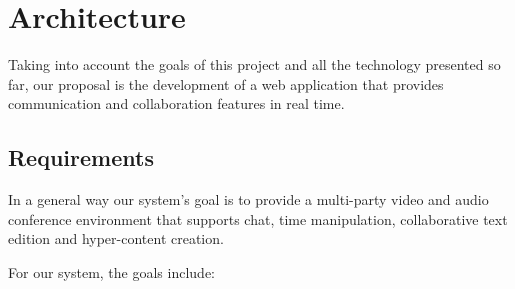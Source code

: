 \chapter{Architecture}
\label{chapter:architecture}


Taking into account the goals of this project and all the technology presented so far, our proposal is the development of a web application that provides communication and collaboration features in real time.

\section{Requirements}
In a general way our system's goal is to provide a multi-party video and audio conference environment that supports chat, time manipulation, collaborative text edition and hyper-content creation.



For our system, the goals include:

